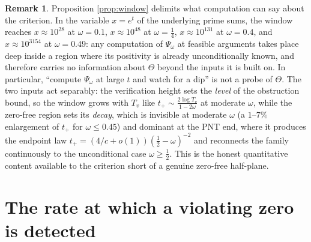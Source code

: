 \documentclass[11pt,reqno]{amsart}
\theoremstyle{plain}
\theoremstyle{definition}
\newtheorem{remark}[theorem]{Remark}
\begin{document}
\begin{remark}\label{rem:nonumerics}
Proposition \ref{prop:window} delimits what computation can say about the criterion. In the
variable $x=e^{t}$ of the underlying prime sums, the window reaches $x\approx10^{28}$ at
$\omega=0.1$, $x\approx10^{48}$ at $\omega=\tfrac14$, $x\approx10^{131}$ at $\omega=0.4$, and
$x\approx10^{3154}$ at $\omega=0.49$: any computation of $\Psi_\omega$ at feasible arguments takes
place deep inside a region where its positivity is already unconditionally known, and therefore
carries no information about $\Theta$ beyond the inputs it is built on. In particular, ``compute
$\Psi_\omega$ at large $t$ and watch for a dip'' is not a probe of $\Theta$. The two inputs act
separably: the verification height sets the \emph{level} of the obstruction bound, so the window
grows with $T_v$ like $t_{+}\sim\frac{2\log T_v}{1-2\omega}$ at moderate $\omega$, while the
zero-free region sets its \emph{decay}, which is invisible at moderate $\omega$ (a $1$--$7\%$
enlargement of $t_+$ for $\omega\le0.45$) and dominant at the PNT end, where it produces the
endpoint law $t_{+}=(4/c+o(1))(\tfrac12-\omega)^{-2}$ and reconnects the family continuously to
the unconditional case $\omega\ge\tfrac12$. This is the honest quantitative content available to
the criterion short of a genuine zero-free half-plane.
\end{remark}

\section{The rate at which a violating zero is detected}\label{sec:sens}
\end{document}

